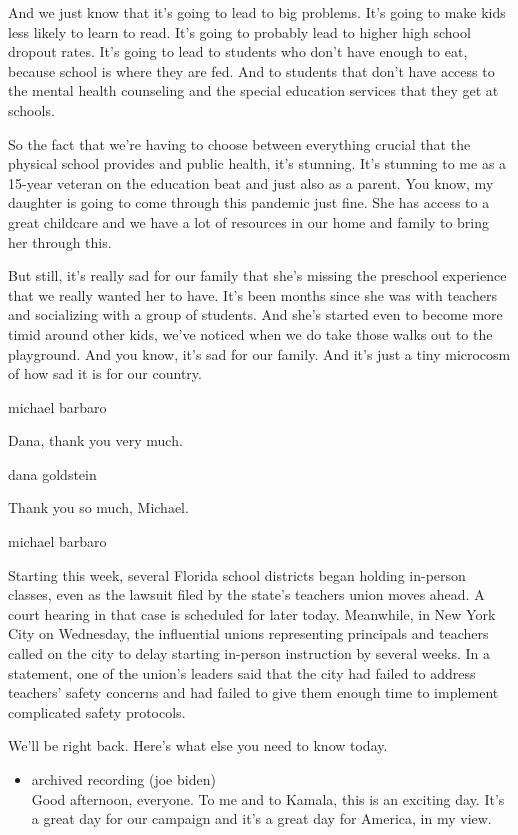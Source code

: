 And we just know that it's going to lead to big problems. It's going to
make kids less likely to learn to read. It's going to probably lead to
higher high school dropout rates. It's going to lead to students who
don't have enough to eat, because school is where they are fed. And to
students that don't have access to the mental health counseling and the
special education services that they get at schools.

So the fact that we're having to choose between everything crucial that
the physical school provides and public health, it's stunning. It's
stunning to me as a 15-year veteran on the education beat and just also
as a parent. You know, my daughter is going to come through this
pandemic just fine. She has access to a great childcare and we have a
lot of resources in our home and family to bring her through this.

But still, it's really sad for our family that she's missing the
preschool experience that we really wanted her to have. It's been months
since she was with teachers and socializing with a group of students.
And she's started even to become more timid around other kids, we've
noticed when we do take those walks out to the playground. And you know,
it's sad for our family. And it's just a tiny microcosm of how sad it is
for our country.

michael barbaro

Dana, thank you very much.

dana goldstein

Thank you so much, Michael.

michael barbaro

Starting this week, several Florida school districts began holding
in-person classes, even as the lawsuit filed by the state's teachers
union moves ahead. A court hearing in that case is scheduled for later
today. Meanwhile, in New York City on Wednesday, the influential unions
representing principals and teachers called on the city to delay
starting in-person instruction by several weeks. In a statement, one of
the union's leaders said that the city had failed to address teachers'
safety concerns and had failed to give them enough time to implement
complicated safety protocols.

We'll be right back. Here's what else you need to know today.

\begin{itemize}
\tightlist
\item
  archived recording (joe biden)\\
  Good afternoon, everyone. To me and to Kamala, this is an exciting
  day. It's a great day for our campaign and it's a great day for
  America, in my view.
\end{itemize}

